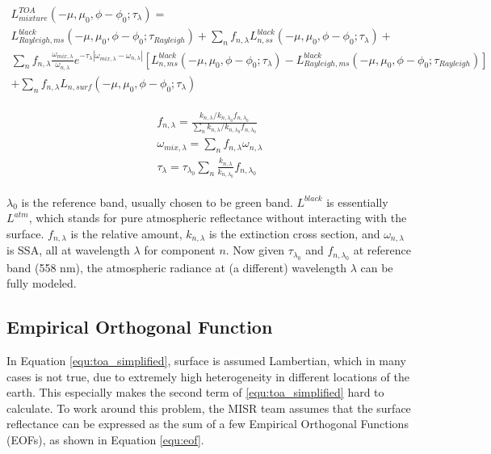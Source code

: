 \begin{multline}
L^{TOA}_{mixture}(-\mu, \mu_0, \phi-\phi_0; \tau_\lambda) = \\
L_{Rayleigh,ms}^{black}(-\mu, \mu_0, \phi-\phi_0; \tau_{Rayleigh}) +
\sum_{n}^{}f_{n,\lambda} L_{n,ss}^{black}(-\mu, \mu_0, \phi-\phi_0; \tau_\lambda)  + \\
\sum_{n}^{} f_{n,\lambda} \frac{\omega_{mix,\lambda}}{\omega_{n,\lambda}} e^{-\tau_\lambda |\omega_{mix,\lambda} - \omega_{n,\lambda}|} \left[ L_{n,ms}^{black}(-\mu, \mu_0, \phi-\phi_0; \tau_\lambda) - L_{Rayleigh,ms}^{black}(-\mu, \mu_0, \phi-\phi_0; \tau_{Rayleigh}) \right] \\
+ \sum_{n}^{} f_{n,\lambda} L_{n,surf} (-\mu, \mu_0, \phi-\phi_0; \tau_\lambda)
\label{equ:mixing}
\end{multline}

\begin{align}
\begin{split}
f_{n,\lambda} = \frac{k_{n,\lambda}/k_{n,\lambda_0} f_{n,\lambda_0}}{ \sum_{n}^{} k_{n,\lambda}/k_{n,\lambda_0} f_{n,\lambda_0}} \\ 
\omega_{mix,\lambda} = \sum_{n}^{}f_{n,\lambda} \omega_{n,\lambda}\\
\tau_\lambda = \tau_{\lambda_0} \sum_{n}^{} \frac{k_{n,\lambda}}{k_{n,\lambda_0}} f_{n,\lambda_0}
\end{split}
\label{equ:mixing2}
\end{align}

$\lambda_0$ is the reference band, usually chosen to be green band. $L^{black}$ is essentially $L^{atm}$, which stands for pure atmospheric reflectance without interacting with the surface. $f_{n,\lambda}$ is the relative amount, $k_{n,\lambda}$ is the extinction cross section, and $\omega_{n,\lambda}$ is SSA, all at wavelength $\lambda$ for component $n$. Now given $\tau_{\lambda_0}$ and $f_{n,\lambda_0}$ at reference band (558 nm), the atmospheric radiance at (a different) wavelength $\lambda$ can be fully modeled.

\subsection{Empirical Orthogonal Function}

In Equation \eqref{equ:toa_simplified}, surface is assumed Lambertian, which in many cases is not true, due to extremely high heterogeneity in different locations of the earth. This especially makes the second term of \eqref{equ:toa_simplified} hard to calculate. To work around this problem, the MISR team assumes that the surface reflectance can be expressed as the sum of a few Empirical Orthogonal Functions (EOFs), as shown in Equation \eqref{equ:eof}.

